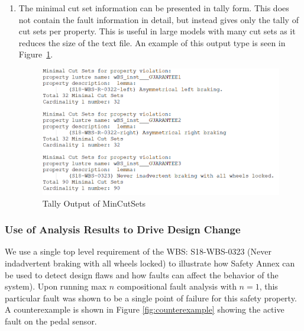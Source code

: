 \begin{enumerate}
\item The minimal cut set information can be presented in tally form. This does not contain the fault information in detail, but instead gives only the tally of cut sets per property. This is useful in large models with many cut sets as it reduces the size of the text file. An example of this output type is seen in Figure~\ref{fig:tallyMCS}.
\begin{figure}[htbp]
	\hspace*{-2cm}
	\vspace{-0.1in} 
	\begin{center}
		\includegraphics[scale=0.7]{images/wbsMCSTally.png}
	\caption{Tally Output of MinCutSets}
		\label{fig:tallyMCS}
	\end{center}
\end{figure}

\end{enumerate}

\subsubsection{Use of Analysis Results to Drive Design Change}
We use a single top level requirement of the WBS: S18-WBS-0323 (Never indadvertent braking with all wheels locked) to illustrate how Safety Annex can be used to detect design flaws and how faults can affect the behavior of the system). Upon running max $n$ compositional fault analysis with $n = 1$, this particular fault was shown to be a single point of failure for this safety property. A counterexample is shown in Figure \ref{fig:counterexample} showing the active fault on the pedal sensor. 

